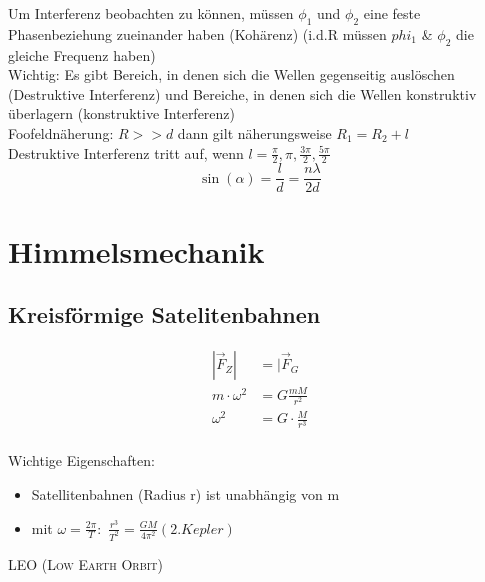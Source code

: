 \documentclass[a4paper,12pt]{report}
\begin{document}
Um Interferenz beobachten zu können, müssen $\phi_1$ und $\phi_2 $ eine feste Phasenbeziehung zueinander haben (Kohärenz)
(i.d.R müssen $phi_1$ \& $\phi_2 $ die gleiche Frequenz haben) \\

Wichtig: Es gibt Bereich, in denen sich die Wellen gegenseitig auslöschen (Destruktive Interferenz) und Bereiche, in denen sich die Wellen konstruktiv überlagern (konstruktive Interferenz) \\

Foofeldnäherung: $ R >> d $ dann gilt näherungsweise $ R_1 = R_2 + l$ \\

Destruktive Interferenz tritt auf, wenn $ l = \frac{\pi}{2}, \pi , \frac{3\pi}{2},\frac{5\pi}{2} $ \\

\begin{equation*}
\sin(\alpha) = \frac{l}{d} = \frac{n\lambda}{2d} 
\end{equation*}



\section{Himmelsmechanik}

\subsection{Kreisförmige Satelitenbahnen}

\begin{align*}
|\vec{F}_Z| &= |\vec{F}_G \\
m\cdot \omega^2 &= G \frac{mM}{r^2} \\
\omega^2 &= G \cdot \frac{M}{r^3} \\
\end{align*}

Wichtige Eigenschaften:

\begin{itemize}
\item Satellitenbahnen (Radius r) ist unabhängig von m
\item mit $ \omega = \frac{2 \pi}{T}: $ \quad $ \frac{r^3}{T^2} = \frac{GM}{4 \pi^2} (2. Kepler) $ \\

\end{itemize}

\textsc{LEO (Low Earth Orbit)} \\ 
\end{document}
